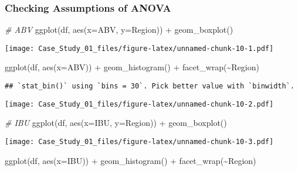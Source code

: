 \documentclass[
]{article}
\newenvironment{Shaded}{\begin{snugshade}}{\end{snugshade}}
\newcommand{\AttributeTok}[1]{\textcolor[rgb]{0.77,0.63,0.00}{#1}}
\newcommand{\CommentTok}[1]{\textcolor[rgb]{0.56,0.35,0.01}{\textit{#1}}}
\newcommand{\FunctionTok}[1]{\textcolor[rgb]{0.00,0.00,0.00}{#1}}
\newcommand{\NormalTok}[1]{#1}
\newcommand{\SpecialCharTok}[1]{\textcolor[rgb]{0.00,0.00,0.00}{#1}}
\begin{document}
\hypertarget{checking-assumptions-of-anova}{%
\subsubsection{Checking Assumptions of
ANOVA}\label{checking-assumptions-of-anova}}

\begin{Shaded}
\begin{Highlighting}[]
\CommentTok{\# ABV}
\FunctionTok{ggplot}\NormalTok{(df, }\FunctionTok{aes}\NormalTok{(}\AttributeTok{x=}\NormalTok{ABV, }\AttributeTok{y=}\NormalTok{Region)) }\SpecialCharTok{+} \FunctionTok{geom\_boxplot}\NormalTok{()}
\end{Highlighting}
\end{Shaded}

\texttt{[image: Case\_Study\_01\_files/figure-latex/unnamed-chunk-10-1.pdf]}

\begin{Shaded}
\begin{Highlighting}[]
\FunctionTok{ggplot}\NormalTok{(df, }\FunctionTok{aes}\NormalTok{(}\AttributeTok{x=}\NormalTok{ABV)) }\SpecialCharTok{+} \FunctionTok{geom\_histogram}\NormalTok{() }\SpecialCharTok{+} \FunctionTok{facet\_wrap}\NormalTok{(}\SpecialCharTok{\textasciitilde{}}\NormalTok{Region)}
\end{Highlighting}
\end{Shaded}

\begin{verbatim}
## `stat_bin()` using `bins = 30`. Pick better value with `binwidth`.
\end{verbatim}

\texttt{[image: Case\_Study\_01\_files/figure-latex/unnamed-chunk-10-2.pdf]}

\begin{Shaded}
\begin{Highlighting}[]
\CommentTok{\# IBU}
\FunctionTok{ggplot}\NormalTok{(df, }\FunctionTok{aes}\NormalTok{(}\AttributeTok{x=}\NormalTok{IBU, }\AttributeTok{y=}\NormalTok{Region)) }\SpecialCharTok{+} \FunctionTok{geom\_boxplot}\NormalTok{()}
\end{Highlighting}
\end{Shaded}

\texttt{[image: Case\_Study\_01\_files/figure-latex/unnamed-chunk-10-3.pdf]}

\begin{Shaded}
\begin{Highlighting}[]
\FunctionTok{ggplot}\NormalTok{(df, }\FunctionTok{aes}\NormalTok{(}\AttributeTok{x=}\NormalTok{IBU)) }\SpecialCharTok{+} \FunctionTok{geom\_histogram}\NormalTok{() }\SpecialCharTok{+} \FunctionTok{facet\_wrap}\NormalTok{(}\SpecialCharTok{\textasciitilde{}}\NormalTok{Region)}
\end{Highlighting}
\end{Shaded}
\end{document}
